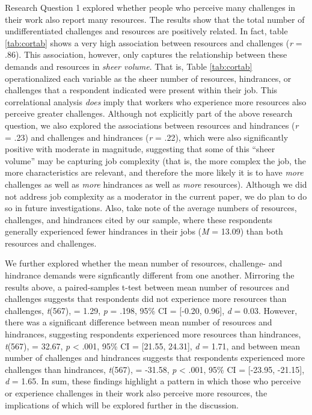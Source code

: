 \documentclass[
  jou]{apa6}
\begin{document}
Research Question 1 explored whether people who perceive many challenges in their work also report many resources. The results show that the total number of undifferentiated challenges and resources are positively related. In fact, table \ref{tab:cortab} shows a very high association between resources and challenges (\emph{r} = .86). This association, however, only captures the relationship between these demands and resources in \emph{sheer volume}. That is, Table \ref{tab:cortab} operationalized each variable as the sheer number of resources, hindrances, or challenges that a respondent indicated were present within their job. This correlational analysis \emph{does} imply that workers who experience more resources also perceive greater challenges. Although not explicitly part of the above research question, we also explored the associations between resources and hindrances (\emph{r} = .23) and challenges and hindrances (\emph{r} = .22), which were also significantly positive with moderate in magnitude, suggesting that some of this ``sheer volume'' may be capturing job complexity (that is, the more complex the job, the more characteristics are relevant, and therefore the more likely it is to have \emph{more} challenges as well as \emph{more} hindrances as well as \emph{more} resources). Although we did not address job complexity as a moderator in the current paper, we do plan to do so in future investigations. Also, take note of the average numbers of resources, challenges, and hindrances cited by our sample, where these respondents generally experienced fewer hindrances in their jobs (\emph{M} = 13.09) than both resources and challenges.

We further explored whether the mean number of resources, challenge- and hindrance demands were signficantly different from one another. Mirroring the results above, a paired-samples t-test between mean number of resources and challenges suggests that respondents did not experience more resources than challenges, \emph{t}(567), = 1.29, \emph{p} = .198, 95\% CI = {[}-0.20, 0.96{]}, \emph{d} = 0.03. However, there was a significant difference between mean number of resources and hindrances, suggesting respondents experienced more resources than hindrances, \emph{t}(567), = 32.67, \emph{p} \textless{} .001, 95\% CI = {[}21.55, 24.31{]}, \emph{d} = 1.71, and between mean number of challenges and hindrances suggests that respondents experienced more challenges than hindrances, \emph{t}(567), = -31.58, \emph{p} \textless{} .001, 95\% CI = {[}-23.95, -21.15{]}, \emph{d} = 1.65. In sum, these findings highlight a pattern in which those who perceive or experience challenges in their work also perceive more resources, the implications of which will be explored further in the discussion.
\end{document}
